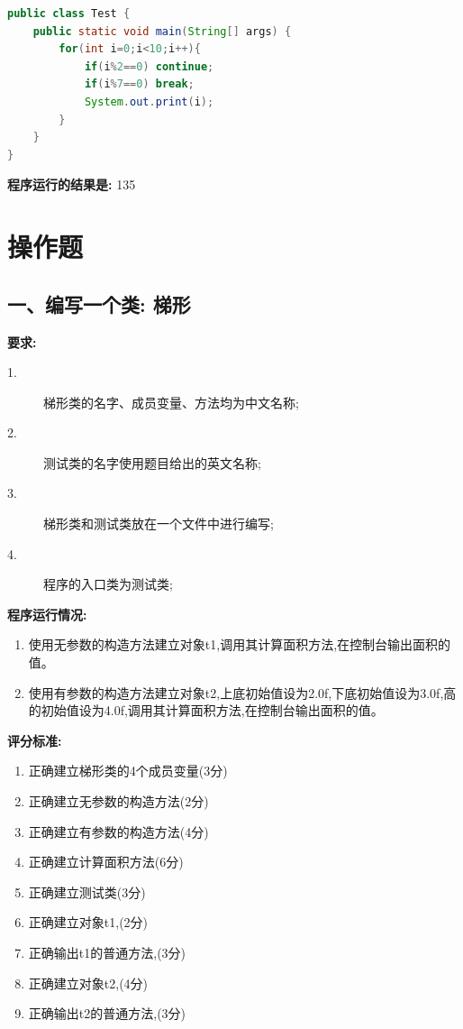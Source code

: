 \documentclass[a4paper,12pt]{article}
\begin{document}
\begin{lstlisting}[language=Java, caption=continue与break]
public class Test {
    public static void main(String[] args) {
        for(int i=0;i<10;i++){
            if(i%2==0) continue;
            if(i%7==0) break;
            System.out.print(i);
        }
    }
}
\end{lstlisting}

\textbf{程序运行的结果是:} 135

\section{操作题}

\subsection{一、编写一个类: 梯形}

\textbf{要求:}
\begin{description}
	\item[1.] 梯形类的名字、成员变量、方法均为中文名称;
	\item[2.] 测试类的名字使用题目给出的英文名称;
	\item[3.] 梯形类和测试类放在一个文件中进行编写;
	\item[4.] 程序的入口类为测试类;
\end{description}

\textbf{程序运行情况:}
\begin{enumerate}
	\item 使用无参数的构造方法建立对象t1,调用其计算面积方法,在控制台输出面积的值。
	\item 使用有参数的构造方法建立对象t2,上底初始值设为2.0f,下底初始值设为3.0f,高的初始值设为4.0f,调用其计算面积方法,在控制台输出面积的值。
\end{enumerate}

\textbf{评分标准:}
\begin{enumerate}
	\item 正确建立梯形类的4个成员变量(3分)
	\item 正确建立无参数的构造方法(2分)
	\item 正确建立有参数的构造方法(4分)
	\item 正确建立计算面积方法(6分)
	\item 正确建立测试类(3分)
	\item 正确建立对象t1,(2分)
	\item 正确输出t1的普通方法,(3分)
	\item 正确建立对象t2,(4分)
	\item 正确输出t2的普通方法,(3分)
\end{enumerate}
\end{document}
